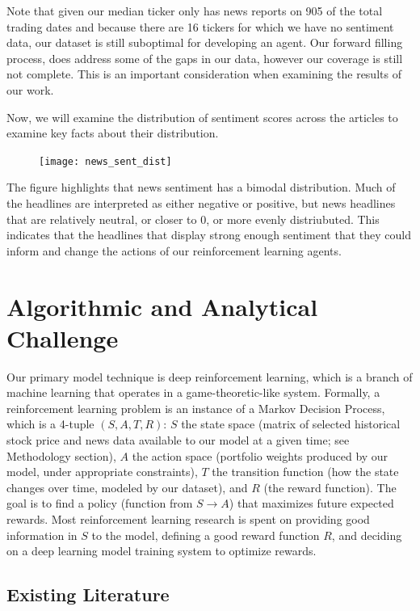 Note that given our median ticker only has news reports on 905 of the total trading dates and because there are 16 tickers for which we have no sentiment data, our dataset is still suboptimal for developing an agent. Our forward filling process, does address some of the gaps in our data, however our coverage is still not complete.
This is an important consideration when examining the results of our work.

Now, we will examine the distribution of sentiment scores across the articles to examine key facts about their distribution.

\begin{figure}
\texttt{[image: news\_sent\_dist]}
\end{figure}

The figure highlights that news sentiment has a bimodal distribution. Much of the headlines are interpreted as either negative or positive, but news headlines that are relatively neutral, or closer to 0, or more evenly distriubuted. 
This indicates that the headlines that display strong enough sentiment that they could inform and change the actions of our reinforcement learning agents.



\section{Algorithmic and Analytical Challenge}

Our primary model technique is deep reinforcement learning, which is a 
branch of machine learning that operates in a game-theoretic-like system. 
Formally, a reinforcement learning problem is an instance of a Markov 
Decision Process, which is a 4-tuple $(S, A, T, R)$: $S$ the state space 
(matrix of selected historical stock price and news data available to 
our model at a given time; see Methodology section), $A$ the action space 
(portfolio weights produced by our model, under appropriate constraints), 
$T$ the transition function (how the state changes over time, modeled by our dataset), 
and $R$ (the reward function). The goal is to find a policy (function from $S \to A$) 
that maximizes future expected rewards. Most reinforcement learning research is 
spent on providing good information in $S$ to the model, defining a good reward 
function $R$, and deciding on a deep learning model training system to optimize rewards.

\subsection{Existing Literature}

